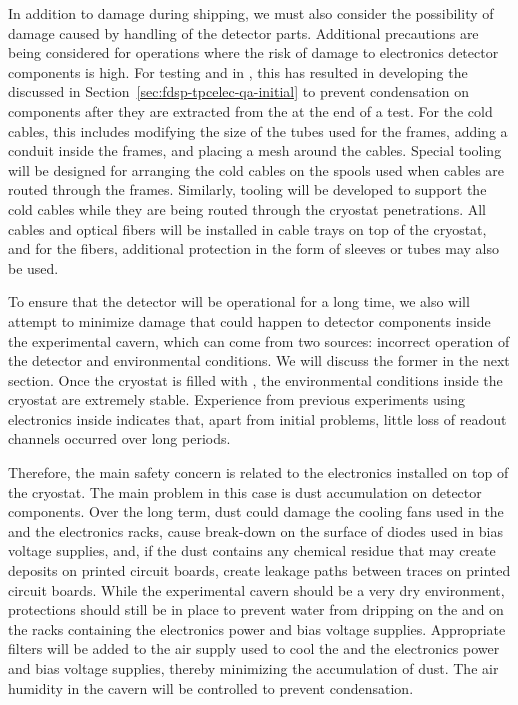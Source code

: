 In addition to damage during shipping, we must also consider the
possibility of damage caused by handling of the detector parts.
Additional precautions are being considered for operations where
the risk of damage to  electronics detector components is
high. For testing  and  
in \lntwo, this has resulted in developing the
 discussed in Section~\ref{sec:fdsp-tpcelec-qa-initial}
to prevent condensation on components after they are extracted from
the \lntwo at the end of a test. For the cold cables, this 
includes modifying the size of the tubes used for the  frames,
adding a conduit inside the frames, and placing a mesh around 
the cables. Special tooling will be designed for arranging the
cold cables on the spools used when cables are routed through
the  frames. Similarly, tooling will be developed to 
support the cold cables while they are being routed through the 
cryostat penetrations. All cables and optical fibers will
be installed in cable trays on top of the cryostat, and for the fibers, additional protection in the form of sleeves or tubes 
may also be used. 

To ensure that the  detector will be operational for a long
time, we also will attempt to minimize 
damage that could happen to detector components inside the 
experimental cavern, which can come from two sources: incorrect
operation of the detector and environmental conditions. We
will discuss the former in the next section. Once the cryostat is filled with , the environmental
conditions inside the cryostat are extremely stable. Experience from 
previous experiments using electronics inside 
 indicates that, apart from initial problems, little loss of readout channels occurred over long periods. 

Therefore, the main safety concern is related to the electronics 
installed on top of the cryostat. The main problem in this case
is dust accumulation on detector components. Over the long
term, dust could damage the cooling fans used
in the  and the  electronics racks, cause break-down 
on the surface of diodes used in bias voltage supplies,
and, if the dust contains any chemical residue that may
create deposits on printed circuit boards, create leakage paths
between traces on printed circuit boards. While the
experimental cavern should be a very dry environment,
protections should still be in place to prevent water from 
dripping on the  and on the racks containing the
 electronics power and bias voltage supplies. Appropriate filters will be added to the
air supply used to cool the  and the  electronics power and bias voltage supplies, thereby minimizing
the accumulation of dust. The air humidity in the cavern 
will be controlled to prevent condensation.

